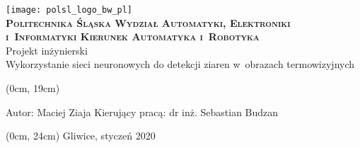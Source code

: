 \newpage
\thispagestyle{empty}
\textblockorigin{3cm}{2.5cm}

\begin{onehalfspacing}
\begin{center}
    \vspace{2\baselineskip}
	\texttt{[image: polsl\_logo\_bw\_pl]}\\
	\vspace{2\baselineskip}
	\fontsize{18}{18} \selectfont
	\textbf{\textsc{Politechnika Śląska \linebreak
	Wydział Automatyki, Elektroniki i~Informatyki \linebreak
	Kierunek Automatyka i~Robotyka}} \\
	\vspace{3\baselineskip}
	Projekt inżynierski \\
	\vspace{3\baselineskip}
	\fontsize{14}{14} \selectfont
	Wykorzystanie sieci neuronowych do detekcji ziaren
	w~obrazach termowizyjnych
    \begin{textblock*}{\textwidth}(0cm, 19cm)
	\begin{flushleft}
	Autor: Maciej Ziaja \linebreak
	Kierujący pracą: dr inż. Sebastian Budzan \linebreak
	\end{flushleft}
	\end{textblock*}
	\begin{textblock*}{\textwidth}(0cm, 24cm)
	\fontsize{12}{12} \selectfont
	Gliwice, styczeń 2020
	\end{textblock*}
\end{center}
\end{onehalfspacing}
\restoregeometry
